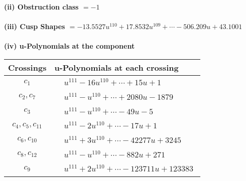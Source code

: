 \documentclass[1p]{elsarticle_modified}
\theoremstyle{definition}
\begin{document}
\flushleft \textbf{(ii) Obstruction class $= -1$}\\~\\
\flushleft \textbf{(iii) Cusp Shapes $= -13.5527 u^{110}+17.8532 u^{109}+\cdots-506.209 u+43.1001$}\\~\\
\newpage\renewcommand{\arraystretch}{1}
\flushleft \textbf{(iv) u-Polynomials at the component}\newline \\
\begin{tabular}{m{50pt}|m{274pt}}
Crossings & \hspace{64pt}u-Polynomials at each crossing \\
\hline $$\begin{aligned}c_{1}\end{aligned}$$&$\begin{aligned}
&u^{111}-16 u^{110}+\cdots+15 u+1
\end{aligned}$\\
\hline $$\begin{aligned}c_{2},c_{7}\end{aligned}$$&$\begin{aligned}
&u^{111}- u^{110}+\cdots+2080 u-1879
\end{aligned}$\\
\hline $$\begin{aligned}c_{3}\end{aligned}$$&$\begin{aligned}
&u^{111}- u^{110}+\cdots-49 u-5
\end{aligned}$\\
\hline $$\begin{aligned}c_{4},c_{5},c_{11}\end{aligned}$$&$\begin{aligned}
&u^{111}-2 u^{110}+\cdots-17 u+1
\end{aligned}$\\
\hline $$\begin{aligned}c_{6},c_{10}\end{aligned}$$&$\begin{aligned}
&u^{111}+3 u^{110}+\cdots-42277 u+3245
\end{aligned}$\\
\hline $$\begin{aligned}c_{8},c_{12}\end{aligned}$$&$\begin{aligned}
&u^{111}- u^{110}+\cdots-882 u+271
\end{aligned}$\\
\hline $$\begin{aligned}c_{9}\end{aligned}$$&$\begin{aligned}
&u^{111}+2 u^{110}+\cdots-123711 u+123383
\end{aligned}$\\
\hline
\end{tabular}\\~\\
\end{document}
